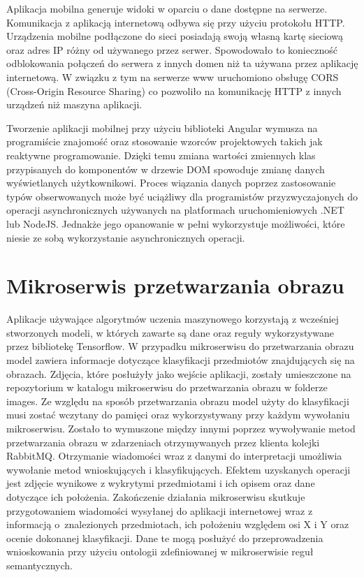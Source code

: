 {{Aplikacja mobilna generuje widoki w oparciu o dane dostępne na serwerze. Komunikacja z aplikacją internetową odbywa się przy użyciu protokołu HTTP. Urządzenia mobilne podłączone do sieci posiadają swoją własną kartę sieciową oraz adres IP różny od używanego przez serwer. Spowodowało to konieczność odblokowania połączeń do serwera z innych domen niż ta używana przez aplikację internetową. W związku z tym na serwerze www uruchomiono obsługę CORS \cite{CORS} (Cross-Origin Resource Sharing) co pozwoliło na komunikację HTTP z innych urządzeń niż maszyna aplikacji. 

Tworzenie aplikacji mobilnej przy użyciu biblioteki Angular wymusza na programiście znajomość oraz stosowanie wzorców projektowych takich jak reaktywne programowanie. Dzięki temu zmiana wartości zmiennych klas przypisanych do komponentów w drzewie DOM spowoduje zmianę danych wyświetlanych użytkownikowi. Proces wiązania danych poprzez zastosowanie typów obserwowanych może być uciążliwy dla programistów przyzwyczajonych do operacji asynchronicznych używanych na platformach uruchomieniowych .NET lub NodeJS. Jednakże jego opanowanie w pełni wykorzystuje możliwości, które niesie ze sobą wykorzystanie asynchronicznych operacji.
}
\section{Mikroserwis przetwarzania obrazu}
{ Aplikacje używające algorytmów uczenia maszynowego korzystają z wcześniej stworzonych modeli, w których zawarte są dane oraz reguły wykorzystywane przez bibliotekę Tensorflow. W przypadku mikroserwisu do przetwarzania obrazu model zawiera informacje dotyczące klasyfikacji przedmiotów znajdujących się na obrazach. Zdjęcia, które posłużyły jako wejście aplikacji, zostały umieszczone na repozytorium w katalogu mikroserwisu do przetwarzania obrazu w folderze images. Ze względu na sposób przetwarzania obrazu model użyty do klasyfikacji musi zostać wczytany do pamięci oraz wykorzystywany przy każdym wywołaniu mikroserwisu. Zostało to wymuszone między innymi poprzez wywoływanie metod przetwarzania obrazu w zdarzeniach otrzymywanych przez klienta kolejki RabbitMQ. Otrzymanie wiadomości wraz z danymi do interpretacji umożliwia wywołanie metod wnioskujących i klasyfikujących. Efektem uzyskanych operacji jest zdjęcie wynikowe z wykrytymi przedmiotami i ich opisem oraz dane dotyczące ich położenia. Zakończenie działania mikroserwisu skutkuje przygotowaniem wiadomości wysyłanej do aplikacji internetowej wraz z informacją o~znalezionych przedmiotach, ich położeniu względem osi X i Y oraz ocenie dokonanej klasyfikacji. Dane te mogą posłużyć do przeprowadzenia wnioskowania przy użyciu ontologii zdefiniowanej w mikroserwisie reguł semantycznych.
	
}}
